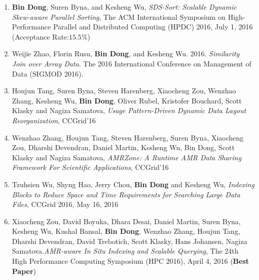 \documentclass[letterpaper,11pt]{article}
\begin{document}
\begin{enumerate}[1)]
\item \textbf{Bin Dong}, Suren Byna, and Kesheng Wu, \textit{SDS-Sort: Scalable Dynamic Skew-aware Parallel Sorting}, The ACM International Symposium on High-Performance Parallel and Distributed Computing (HPDC) 2016, July 1, 2016 (Acceptance Rate:$15.5\%$)
\item Weijie Zhao, Florin Rusu, \textbf{Bin Dong}, and Kesheng Wu. 2016. \textit{Similarity Join over Array Data}. The 2016 International Conference on Management of Data (SIGMOD 2016). 
\item Houjun Tang, Suren Byna, Steven Harenberg, Xiaocheng Zou, Wenzhao Zhang, Kesheng Wu, \textbf{Bin Dong}, Oliver Rubel, Kristofer Bouchard, Scott Klasky and Nagiza Samatova, \textit{Usage Pattern-Driven Dynamic Data Layout Reorganization}, CCGrid'16
\item Wenzhao Zhang, Houjun Tang, Steven Harenberg, Suren Byna, Xiaocheng Zou, Dharshi Devendran, Daniel Martin, Kesheng Wu, Bin Dong, Scott Klasky and Nagiza Samatova, \textit{AMRZone: A Runtime AMR Data Sharing Framework For Scientific Applications}, CCGrid'16 
\item Tzuhsien Wu, Shyng Hao, Jerry Chou, \textbf{Bin Dong} and Kesheng Wu, \textit{Indexing Blocks to Reduce Space and Time Requirements for Searching Large Data Files}, CCGrid 2016, May 16, 2016
	\item Xiaocheng Zou, David Boyuka, Dhara Desai, Daniel Martin, Suren Byna, Kesheng Wu, Kushal Bansal, \textbf{Bin Dong}, Wenzhao Zhang, Houjun Tang, Dharshi Devendran, David Trebotich, Scott Klasky, Hans Johansen, Nagiza Samatova.\textit{AMR-aware In Situ Indexing and Scalable Querying}, The 24th High Performance Computing Symposium (HPC 2016), April 4, 2016 (\textbf{Best Paper})


\end{enumerate}
\end{document}
